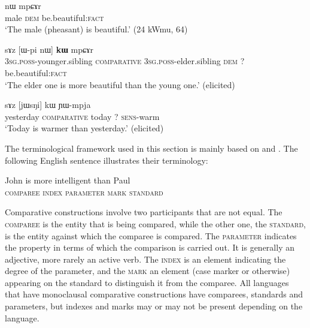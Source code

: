 \documentclass[oldfontcommands,oneside,a4paper,11pt]{article}
\newcommand{\ipa}[1]{{\phon #1}} %
\begin{document}
\begin{exe}
\ex \label{ex:simple}
\gll  \ipa{pʰu}   	\ipa{nɯ}   \ipa{mpɕɤr}     \\
  male \textsc{dem}    be.beautiful:\textsc{fact} \\
\glt `The male (pheasant) is beautiful.' (24 kWmu, 64)
\end{exe}

\begin{exe}
\ex \label{ex:comp1}
\gll  \ipa{ɯ-ʁi}   	\ipa{sɤz}   	[\ipa{ɯ-pi}   	\ipa{nɯ}]   	\ipa{\textbf{kɯ}}   	\ipa{mpɕɤr}     \\
\textsc{3sg.poss}-younger.sibling \textsc{comparative} \textsc{3sg.poss}-elder.sibling \textsc{dem} ?{ }  be.beautiful:\textsc{fact} \\
\glt `The elder one is more beautiful than the young one.' (elicited)
\end{exe}
 
 
\begin{exe}
\ex \label{ex:comparative.complete}
\gll \ipa{jɯfɕɯr}   	\ipa{sɤz }   	[\ipa{jɯsŋi}]   	\ipa{kɯ}   	\ipa{ɲɯ-mpja}   \\
yesterday \textsc{comparative} today ? \textsc{sens}-warm \\
\glt `Today is warmer than yesterday.' (elicited)
\end{exe}

The terminological framework used in this section is mainly based on \citet{dixon08comparative} and \citet{stassen11comparative}. The following English sentence   illustrates their  terminology:

\begin{exe}
\ex \label{ex:comp.eng}
\gll  John is more intelligent than Paul \\
\textsc{comparee} { } \textsc{index} \textsc{parameter} \textsc{mark} \textsc{standard}  \\
\end{exe}

Comparative constructions involve two participants that are not equal. The \textsc{comparee} is  the entity that is being compared, while the other one, the \textsc{standard}, is the entity against which the comparee is compared. The \textsc{parameter} indicates the property in terms of which the comparison is carried out. It is generally an adjective, more rarely an active verb. The \textsc{index} is an element indicating the degree of the parameter, and the \textsc{mark} an element (case marker or otherwise) appearing on the standard to distinguish it from the comparee. All languages that have monoclausal comparative constructions have comparees, standards and parameters, but indexes and marks may or may not be present depending on the language.
\end{document}

